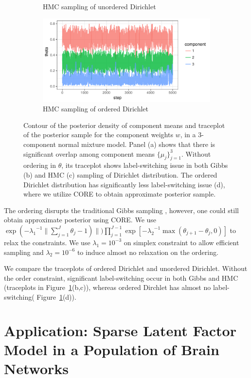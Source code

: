 \documentclass[10pt,fleqn]{article} \pdfoutput=1
\DeclareMathOperator{\1}{\mathbbm{1}} \DeclareMathOperator{\bigO}{\mc O}
\begin{document}
\begin{figure}[H]
\begin{subfigure}[b]{0.32\textwidth}
    \caption{\small  HMC sampling of unordered Dirichlet}
      \end{subfigure}
       \begin{subfigure}[b]{0.32\textwidth}
 \includegraphics[width=1\textwidth]{fmm_w_hmc.pdf}
     \caption{\small  HMC sampling of ordered Dirichlet}
     \end{subfigure}
\caption{Contour of the posterior density of component means and traceplot of the posterior sample for the component weights $w$, in a 3-component normal mixture model. Panel (a) shows that there is significant overlap among component means $\{\mu_j\}_{j=1}^3$. Without ordering in $\theta$, its traceplot shows label-switching issue in both Gibbs (b) and HMC  (c) sampling of Dirichlet distribution. The ordered Dirichlet distribution has significantly less label-switching issue (d), where we utilize CORE to obtain approximate posterior sample.}
\label{dirichlet}
\end{figure}


The ordering disrupts the traditional Gibbs sampling \citep{ishwaran2001gibbs}, however, one could still obtain approximate posterior using CORE. We use $
\exp ( -  {\lambda_1}^{-1} \| \sum_{j=1}^J  \theta_{j} - 1) \|)
\prod_{j=1}^{J-1} \exp [ -  {\lambda_2}^{-1}  \max( \theta_{j+1} - \theta_j,0)]  $ to relax the constraints. We use $\lambda_1 = 10^{-3}$ on simplex constraint to allow efficient sampling and $\lambda_2 = 10^{-6}$ to induce almost no relaxation on the ordering.

We compare the traceplots of ordered Dirichlet and unordered Dirichlet. Without the order constraint, significant label-switching occur in both Gibbs and HMC (traceplots in Figure~\ref{dirichlet}(b,c)), whereas ordered Dirchlet has almost no label-switching( Figure~\ref{dirichlet}(d)).

\section{Application: Sparse Latent Factor Model in a Population of Brain Networks}
\end{document}
